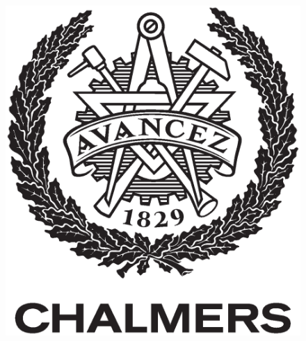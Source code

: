 {\begin{center}
\begin{figure}[H]
    \includegraphics[width=0.2\pdfpagewidth]{template/figures/AvancezChalmers_black_centered.eps} \\
    \fi
	\end{figure}	\vspace{5mm}

	\thesisDepartment\\
	\emph{\thesisDivision}\\
	\ifx\thesisGroup\undefined
    \else
    \thesisGroup\\
    \fi
	\textsc{\thesisUniversity}\\
	\thesisLocation\ \thesisYear\\
\end{center}
}
